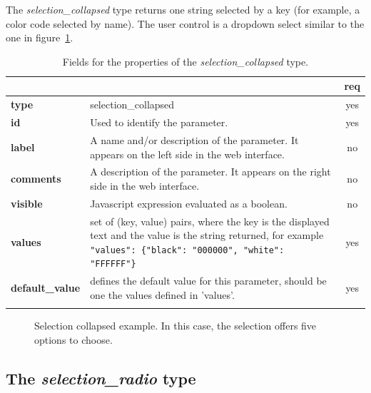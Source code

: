 The \emph{selection\_collapsed} type returns one string selected by a key (for example, a color code selected by name). The user control is a dropdown select similar to the one in figure~\ref{fig:selection_collapsed_example}.

\begin{longtable}{|>{\bf}L{\linewidth}|L{\linewidth}|c|}
\hline
      &  & {\bf req} 
\tabularnewline \hline \hline
 type  & selection\_collapsed    & yes \\ \hline
 id     & Used to identify the parameter. & yes \\ \hline
 label  & A name and/or description of the parameter. It appears on the left side in the web interface. & no
                      \\ \hline
 comments & A description of the parameter. It appears on the right side in the web interface. & no
                      \\ \hline
 visible    & Javascript expression evaluated as a boolean.
            & no \\ \hline
 values & set of (key, value) pairs, where the key is the displayed text and the 
value is the string returned, for example \texttt{"values": \{"black": "000000", "white": "FFFFFF"\}} & yes
                      \\ \hline
 default\_value & defines the default value for this parameter, should be one 
the values defined in 'values'. & yes \\ \hline
\caption{Fields for the properties of the \emph{selection\_collapsed} type.}
\end{longtable}

\begin{figure}[h]
\centering
{}
\caption{Selection collapsed example. In this case, the selection offers five options to choose.}
\label{fig:selection_collapsed_example}
\end{figure}

\clearpage
\subsection{The \emph{selection\_radio} type}

